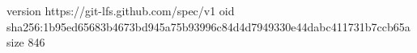 version https://git-lfs.github.com/spec/v1
oid sha256:1b95ed65683b4673bd945a75b93996c84d4d7949330e44dabc411731b7ccb65a
size 846
